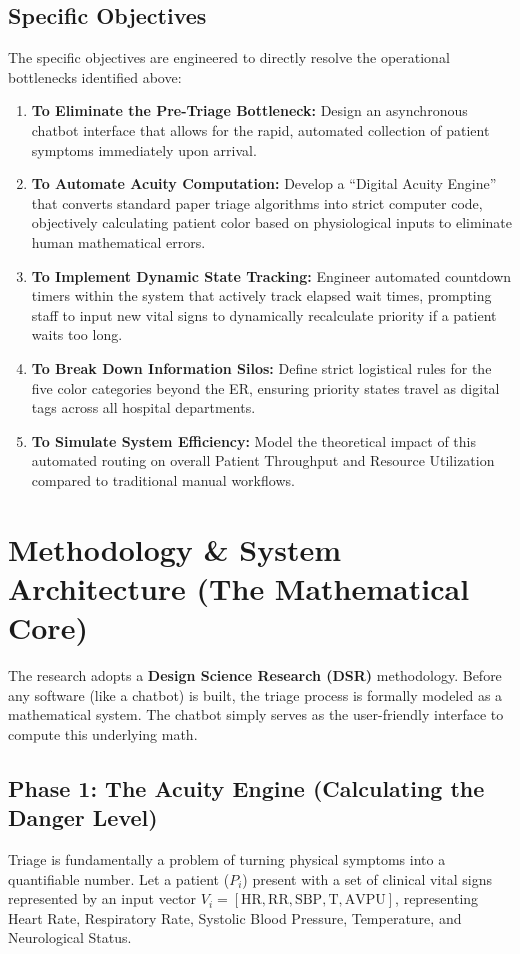 \documentclass[12pt, a4paper]{article}
\begin{document}
	\subsection*{Specific Objectives}
	The specific objectives are engineered to directly resolve the operational bottlenecks identified above:
	\begin{enumerate}
		\item \textbf{To Eliminate the Pre-Triage Bottleneck:} Design an asynchronous chatbot interface that allows for the rapid, automated collection of patient symptoms immediately upon arrival.
		\item \textbf{To Automate Acuity Computation:} Develop a ``Digital Acuity Engine'' that converts standard paper triage algorithms into strict computer code, objectively calculating patient color based on physiological inputs to eliminate human mathematical errors.
		\item \textbf{To Implement Dynamic State Tracking:} Engineer automated countdown timers within the system that actively track elapsed wait times, prompting staff to input new vital signs to dynamically recalculate priority if a patient waits too long.
		\item \textbf{To Break Down Information Silos:} Define strict logistical rules for the five color categories beyond the ER, ensuring priority states travel as digital tags across all hospital departments.
		\item \textbf{To Simulate System Efficiency:} Model the theoretical impact of this automated routing on overall Patient Throughput and Resource Utilization compared to traditional manual workflows.
	\end{enumerate}
	
	\section{Methodology \& System Architecture (The Mathematical Core)}
	The research adopts a \textbf{Design Science Research (DSR)} methodology. Before any software (like a chatbot) is built, the triage process is formally modeled as a mathematical system. The chatbot simply serves as the user-friendly interface to compute this underlying math.
	
	\subsection*{Phase 1: The Acuity Engine (Calculating the Danger Level)}
	Triage is fundamentally a problem of turning physical symptoms into a quantifiable number. Let a patient ($P_i$) present with a set of clinical vital signs represented by an input vector $V_i = [\text{HR}, \text{RR}, \text{SBP}, \text{T}, \text{AVPU}]$, representing Heart Rate, Respiratory Rate, Systolic Blood Pressure, Temperature, and Neurological Status.
	
\end{document}
